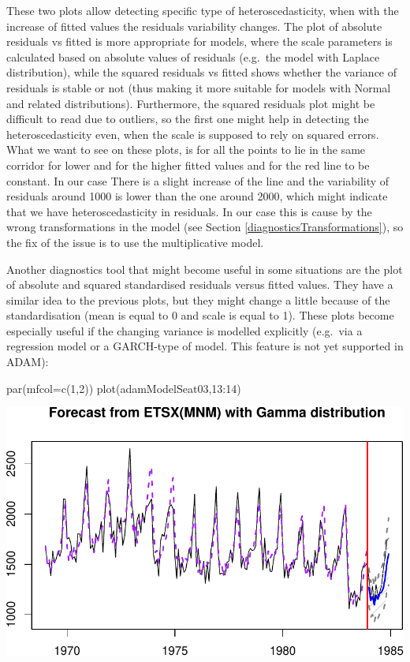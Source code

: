 \documentclass[
]{book}
\newenvironment{Shaded}{\begin{snugshade}}{\end{snugshade}}
\newcommand{\AttributeTok}[1]{\textcolor[rgb]{0.77,0.63,0.00}{#1}}
\newcommand{\DecValTok}[1]{\textcolor[rgb]{0.00,0.00,0.81}{#1}}
\newcommand{\FunctionTok}[1]{\textcolor[rgb]{0.00,0.00,0.00}{#1}}
\newcommand{\NormalTok}[1]{#1}
\newcommand{\SpecialCharTok}[1]{\textcolor[rgb]{0.00,0.00,0.00}{#1}}
\theoremstyle{definition}
\theoremstyle{definition}
\theoremstyle{definition}
\theoremstyle{definition}
\theoremstyle{remark}
\begin{document}
These two plots allow detecting specific type of heteroscedasticity, when with the increase of fitted values the residuals variability changes. The plot of absolute residuals vs fitted is more appropriate for models, where the scale parameters is calculated based on absolute values of residuals (e.g.~the model with Laplace distribution), while the squared residuals vs fitted shows whether the variance of residuals is stable or not (thus making it more suitable for models with Normal and related distributions). Furthermore, the squared residuals plot might be difficult to read due to outliers, so the first one might help in detecting the heteroscedasticity even, when the scale is supposed to rely on squared errors. What we want to see on these plots, is for all the points to lie in the same corridor for lower and for the higher fitted values and for the red line to be constant. In our case There is a slight increase of the line and the variability of residuals around 1000 is lower than the one around 2000, which might indicate that we have heteroscedasticity in residuals. In our case this is cause by the wrong transformations in the model (see Section \ref{diagnosticsTransformations}), so the fix of the issue is to use the multiplicative model.

Another diagnostics tool that might become useful in some situations are the plot of absolute and squared standardised residuals versus fitted values. They have a similar idea to the previous plots, but they might change a little because of the standardisation (mean is equal to 0 and scale is equal to 1). These plots become especially useful if the changing variance is modelled explicitly (e.g.~via a regression model or a GARCH-type of model. This feature is not yet supported in ADAM):

\begin{Shaded}
\begin{Highlighting}[]
\FunctionTok{par}\NormalTok{(}\AttributeTok{mfcol=}\FunctionTok{c}\NormalTok{(}\DecValTok{1}\NormalTok{,}\DecValTok{2}\NormalTok{))}
\FunctionTok{plot}\NormalTok{(adamModelSeat03,}\DecValTok{13}\SpecialCharTok{:}\DecValTok{14}\NormalTok{)}
\end{Highlighting}
\end{Shaded}

\includegraphics{adam_files/figure-latex/unnamed-chunk-156-1.pdf}
\end{document}
